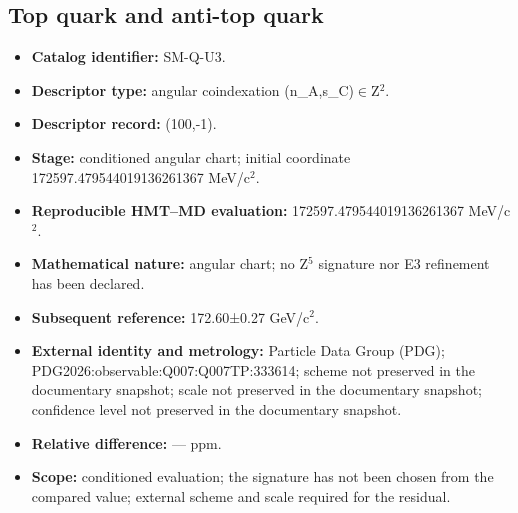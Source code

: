 \subsection{Top quark and anti-top quark}
\begin{itemize}
\item \textbf{Catalog identifier:} SM-Q-U3.
\item \textbf{Descriptor type:} angular coindexation (n\_A,s\_C)\(\in\)Z\({}^{2}\).
\item \textbf{Descriptor record:} (100,-1).
\item \textbf{Stage:} conditioned angular chart; initial coordinate 172597.479544\allowbreak{}019136\allowbreak{}261367 MeV/c\({}^{2}\).
\item \textbf{Reproducible HMT--MD evaluation:} 172597.479544\allowbreak{}019136\allowbreak{}261367 MeV/c\({}^{2}\).
\item \textbf{Mathematical nature:} angular chart; no Z\({}^{5}\) signature nor E3 refinement has been declared.
\item \textbf{Subsequent reference:} 172.60±\allowbreak{}0.27 GeV/c\({}^{2}\).
\item \textbf{External identity and metrology:} Particle Data Group (PDG); PDG2026:\allowbreak{}observable:\allowbreak{}Q007:\allowbreak{}Q007TP:\allowbreak{}333614; scheme not preserved in the documentary snapshot; scale not preserved in the documentary snapshot; confidence level not preserved in the documentary snapshot.
\item \textbf{Relative difference:} --- ppm.
\item \textbf{Scope:} conditioned evaluation; the signature has not been chosen from the compared value; external scheme and scale required for the residual.
\end{itemize}
